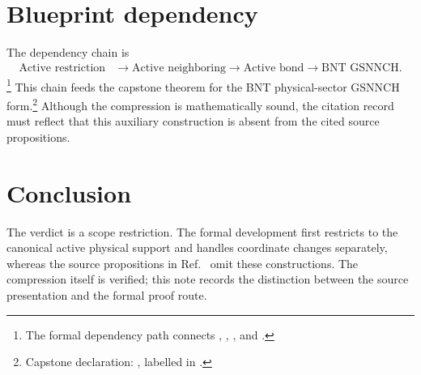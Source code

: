 \documentclass{article}
\begin{document}
\section{Blueprint dependency}

The dependency chain is
\begin{align}
    \text{Active restriction}
        &\longrightarrow
    \text{Active neighboring}
        \longrightarrow
    \text{Active bond}
        \longrightarrow
    \text{BNT GSNNCH}.
    \label{eq:cpsv16_active_physical_support_compression_blueprint_dependency}
\end{align}
\footnote{The formal dependency path connects
,
,
, and
.}
This chain feeds the capstone theorem for the BNT physical-sector GSNNCH
form.\footnote{Capstone declaration:
,
labelled  in
.}
Although the compression is mathematically sound, the citation record must
reflect that this auxiliary construction is absent from the cited source
propositions.

\section{Conclusion}

The verdict is a scope restriction. The formal development first restricts to
the canonical active physical support and handles coordinate changes
separately, whereas the source propositions in Ref.~\cite{Cirac2016MPDO_arXiv}
omit these constructions. The compression itself is verified; this note records
the distinction between the source presentation and the formal proof route.



\end{document}
